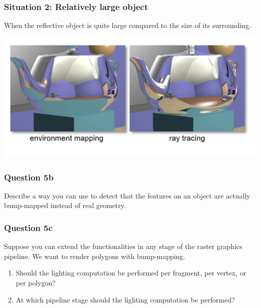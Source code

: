 \documentclass{beamer}
\begin{document}
\begin{frame}
    \frametitle{Situation 2: Relatively large object}

    When the reflective object is quite large compared to the size of its surrounding.
    
    \begin{center}
        \includegraphics[scale=0.5]{env-inaccuracy.png}
    \end{center}

\end{frame}

\begin{frame}
    \frametitle{Question 5b}

    Describe a way you can use to detect that the features on an object are actually bump-mapped 
    instead of real geometry.

\end{frame}

\begin{frame}
    \frametitle{Question 5c}

    Suppose you can extend the functionalities in any stage of the raster graphics pipeline. 
    We want to render polygons with bump-mapping. 

    \begin{enumerate}
        \item Should the lighting computation be performed per fragment, per vertex, or per polygon?
        \item At which pipeline stage should the lighting computation be performed?
    \end{enumerate}

\end{frame}
\end{document}
